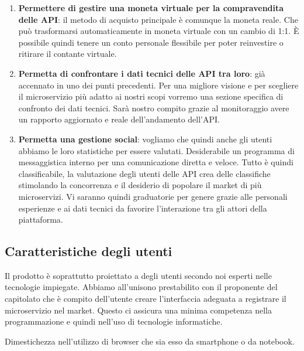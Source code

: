 \documentclass[12pt,a4paper,titlepage]{article}
\begin{document}
\begin{enumerate}
\item \textbf{Permettere di gestire una moneta virtuale per la compravendita delle API}:	il metodo di acquisto principale è comunque la moneta reale. Che può trasformarsi automaticamente in moneta virtuale con un cambio di 1:1. È possibile quindi tenere un conto personale flessibile per poter reinvestire o ritirare il contante virtuale. 
\item \textbf{Permetta di confrontare i dati tecnici delle API tra loro}:	già accennato in uno dei punti precedenti. Per una migliore visione e per scegliere il microservizio più adatto ai nostri scopi vorremo una sezione specifica di confronto dei dati tecnici. Sarà nostro compito grazie al monitoraggio avere un rapporto aggiornato e reale dell'andamento dell'API.
\item \textbf{Permetta una gestione social}:	vogliamo che quindi anche gli utenti abbiamo le loro statistiche per essere valutati. Desiderabile un programma di messaggistica interno per una comunicazione diretta e veloce. Tutto è quindi classificabile, la valutazione degli utenti delle API crea delle classifiche stimolando la concorrenza e il desiderio di popolare il market di più microservizi. Vi saranno quindi graduatorie per genere grazie alle personali esperienze e ai dati tecnici da favorire l'interazione tra gli attori della piattaforma.
\end{enumerate}
\subsection{Caratteristiche degli utenti}
Il prodotto è soprattutto proiettato a degli utenti secondo noi esperti nelle tecnologie impiegate. Abbiamo all'unisono prestabilito con il proponente del capitolato che è compito dell'utente creare l'interfaccia adeguata a registrare il microservizio nel market. Questo ci assicura una minima competenza nella programmazione e quindi nell'uso di tecnologie informatiche.

Dimestichezza nell'utilizzo di browser che sia esso da smartphone o da notebook. 
\end{document}
